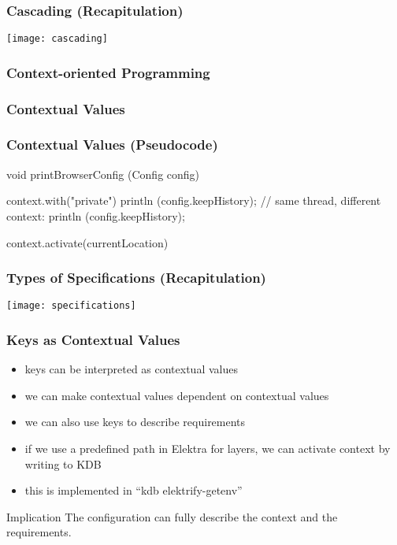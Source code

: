 \begin{frame}
	\frametitle{Cascading (Recapitulation)}
	\texttt{[image: cascading]}
\end{frame}

\begin{frame}
	\frametitle{Context-oriented Programming}
\end{frame}

\begin{frame}
	\frametitle{Contextual Values}
\end{frame}

\begin{frame}[fragile]
	\frametitle{Contextual Values (Pseudocode)}

	\begin{code}[gobble=4,language=C++,morekeywords={context}]
	void printBrowserConfig (Config config)
	{
		context.with("private")
		{
			println (config.keepHistory);
		}
		// same thread, different context:
		println (config.keepHistory);

		context.activate(currentLocation)
	}
	\end{code}
\end{frame}

\begin{frame}
	\frametitle{Types of Specifications (Recapitulation)}
	\texttt{[image: specifications]}
\end{frame}

\begin{frame}
	\frametitle{Keys as Contextual Values}

	\begin{itemize}[<+-| alert@+>]
	\item keys can be interpreted as contextual values~\cite{raab2016persistent,raab2017introducing}
	\item we can make contextual values dependent on contextual values
	\item we can also use keys to describe requirements
	\item if we use a predefined path in Elektra for layers, we can activate context by writing to KDB
	\item this is implemented in ``kdb elektrify-getenv''
	\end{itemize}

	\pause[\thebeamerpauses]

	\begin{alertblock}{Implication}
	The configuration can fully describe the context and the requirements.
	\end{alertblock}
\end{frame}

